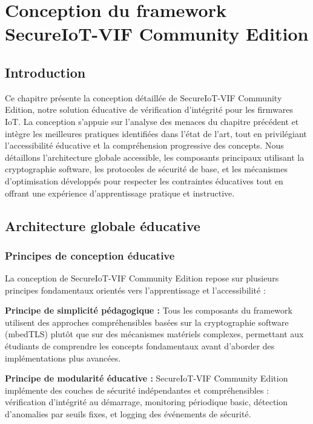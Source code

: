
\chapter{Conception du framework SecureIoT-VIF Community Edition}
\label{chap:framework-design}

\section{Introduction}

Ce chapitre présente la conception détaillée de SecureIoT-VIF Community Edition, notre solution éducative de vérification d'intégrité pour les firmwares IoT. La conception s'appuie sur l'analyse des menaces du chapitre précédent et intègre les meilleures pratiques identifiées dans l'état de l'art, tout en privilégiant l'accessibilité éducative et la compréhension progressive des concepts. Nous détaillons l'architecture globale accessible, les composants principaux utilisant la cryptographie software, les protocoles de sécurité de base, et les mécanismes d'optimisation développés pour respecter les contraintes éducatives tout en offrant une expérience d'apprentissage pratique et instructive.

\section{Architecture globale éducative}

\subsection{Principes de conception éducative}

La conception de SecureIoT-VIF Community Edition repose sur plusieurs principes fondamentaux orientés vers l'apprentissage et l'accessibilité :

\textbf{Principe de simplicité pédagogique :} Tous les composants du framework utilisent des approches compréhensibles basées sur la cryptographie software (mbedTLS) plutôt que sur des mécanismes matériels complexes, permettant aux étudiants de comprendre les concepts fondamentaux avant d'aborder des implémentations plus avancées.

\textbf{Principe de modularité éducative :} SecureIoT-VIF Community Edition implémente des couches de sécurité indépendantes et compréhensibles : vérification d'intégrité au démarrage, monitoring périodique basic, détection d'anomalies par seuils fixes, et logging des événements de sécurité.

